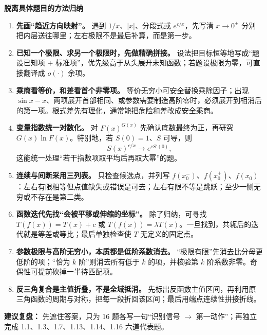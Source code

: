 \begin{knowledgeBox}
\textbf{脱离具体题目的方法归纳}

\begin{enumerate}
  \item \textbf{先画“趋近方向映射”。} 遇到 \(1/x\)、\(|x|\)、分段式或
  \(e^{c/x}\)，先写清 \(x\to0^\pm\) 分别把内层送往哪里；左右极限不是最后补算，而是第一步。

  \item \textbf{已知一个极限、求另一个极限时，先做精确拼接。} 设法把目标恒等地写成“题设已知项 \(+\) 标准项”，优先级高于从头展开未知函数；若题设极限为零，可直接翻译成 \(o(\cdot)\) 余项。

  \item \textbf{乘商看等价，和差看首个非零项。} 等价无穷小可安全替换乘除因子；出现 \(\sin x-x\)、两项展开首部相同、或参数需要制造高阶零时，必须展开到相消后的第一项。根式差先有理化，通常能把危险和差改成安全乘商。

  \item \textbf{变量指数统一对数化。} 对 \(F(x)^{G(x)}\) 先确认底数最终为正，再研究 \(G(x)\ln F(x)\)。特别地，若 \(S(0)=1\)、\(S\) 可导，则
  \[
    S(x)^{c/x}\longrightarrow e^{cS'(0)},
  \]
  这能统一处理“若干指数项取平均后再取大幂”的题。

  \item \textbf{连续与间断采用三列表。} 只检查候选点，并列写
  \(f(x_0^-)\)、\(f(x_0^+)\)、\(f(x_0)\)：左右有限相等但点值缺失或错误是可去；左右有限不等是跳跃；至少一侧无穷或不存在是第二类。

  \item \textbf{函数迭代先找“会被平移或伸缩的坐标”。} 除了归纳，可寻找
  \(T(f(x))=T(x)+c\) 或 \(T(f(x))=\lambda T(x)\)。一旦找到，共轭后的迭代就是等差或等比；最后单独检查使 \(T\) 无定义的固定点。

  \item \textbf{参数极限与高阶无穷小，本质都是低阶系数消去。} “极限有限”先消去比分母更低阶的项；“恰为 \(k\) 阶”则消去所有低于 \(k\) 的项，并核验第 \(k\) 阶系数非零。奇偶性可提前砍掉一半待匹配项。

  \item \textbf{反三角复合是主值折叠，不是全域抵消。} 先标出反函数主值区间，再利用原三角函数的周期与对称，把每一段折回该区间；最后用端点连续性拼接折线。
\end{enumerate}

\textbf{建议复盘：} 先遮住答案，只为 16 题各写一句“识别信号 \(\to\) 第一动作”；再独立完成 1.1、1.3、1.7、1.13、1.14、1.16 六道代表题。
\end{knowledgeBox}
